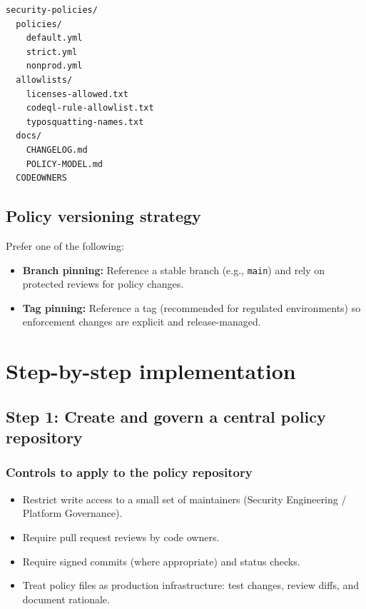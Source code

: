 \documentclass[11pt]{article}
\renewcommand{\cmd}[1]{\texttt{#1}}
\begin{document}
\begin{lstlisting}[style=ghascode]
security-policies/
  policies/
    default.yml
    strict.yml
    nonprod.yml
  allowlists/
    licenses-allowed.txt
    codeql-rule-allowlist.txt
    typosquatting-names.txt
  docs/
    CHANGELOG.md
    POLICY-MODEL.md
  CODEOWNERS
\end{lstlisting}

\subsection{Policy versioning strategy}

Prefer one of the following:
\begin{itemize}[leftmargin=*]
  \item \textbf{Branch pinning:} Reference a stable branch (e.g., \cmd{main}) and rely on protected reviews for policy changes.
  \item \textbf{Tag pinning:} Reference a tag (recommended for regulated environments) so enforcement changes are explicit and release-managed.
\end{itemize}

\section{Step-by-step implementation}

\subsection{Step 1: Create and govern a central policy repository}

\subsubsection{Controls to apply to the policy repository}

\begin{itemize}[leftmargin=*]
  \item Restrict write access to a small set of maintainers (Security Engineering / Platform Governance).
  \item Require pull request reviews by code owners.
  \item Require signed commits (where appropriate) and status checks.
  \item Treat policy files as production infrastructure: test changes, review diffs, and document rationale.
\end{itemize}
\end{document}
